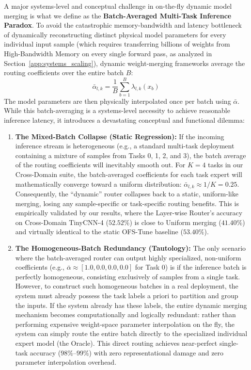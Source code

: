 A major systems-level and conceptual challenge in on-the-fly dynamic model merging is what we define as the \textbf{Batch-Averaged Multi-Task Inference Paradox}. To avoid the catastrophic memory-bandwidth and latency bottleneck of dynamically reconstructing distinct physical model parameters for every individual input sample (which requires transferring billions of weights from High-Bandwidth Memory on every single forward pass, as analyzed in Section~\ref{app:systems_scaling}), dynamic weight-merging frameworks average the routing coefficients over the entire batch $B$:
\begin{equation}
\bar{\alpha}_{l, k} = \frac{1}{B} \sum_{b=1}^B \lambda_{l, k}(x_b)
\end{equation}
The model parameters are then physically interpolated once per batch using $\bar{\alpha}$. While this batch-averaging is a systems-level necessity to achieve reasonable inference latency, it introduces a devastating conceptual and functional dilemma:
\begin{enumerate}
    \item \textbf{The Mixed-Batch Collapse (Static Regression):} If the incoming inference stream is heterogeneous (e.g., a standard multi-task deployment containing a mixture of samples from Tasks 0, 1, 2, and 3), the batch average of the routing coefficients will inevitably smooth out. For $K=4$ tasks in our Cross-Domain suite, the batch-averaged coefficients for each task expert will mathematically converge toward a uniform distribution: $\bar{\alpha}_{l, k} \approx 1/K = 0.25$. Consequently, the ``dynamic'' router collapses back to a static, uniform-like merging, losing any sample-specific or task-specific routing benefits. This is empirically validated by our results, where the Layer-wise Router's accuracy on Cross-Domain TinyCNN-4 ($52.52\%$) is close to Uniform merging ($41.40\%$) and virtually identical to the static OFS-Tune baseline ($53.40\%$).
    \item \textbf{The Homogeneous-Batch Redundancy (Tautology):} The only scenario where the batch-averaged router can output highly specialized, non-uniform coefficients (e.g., $\bar{\alpha} \approx [1.0, 0.0, 0.0, 0.0]$ for Task 0) is if the inference batch is perfectly homogeneous, consisting exclusively of samples from a single task. However, to construct such homogeneous batches in a real deployment, the system must already possess the task labels a priori to partition and group the inputs. If the system already has these labels, the entire dynamic merging mechanism becomes computationally and logically redundant: rather than performing expensive weight-space parameter interpolation on the fly, the system can simply route the entire batch directly to the specialized individual expert model (the Oracle). This direct routing achieves near-perfect single-task accuracy ($98\%$--$99\%$) with zero representational damage and zero parameter interpolation overhead.
\end{enumerate}
